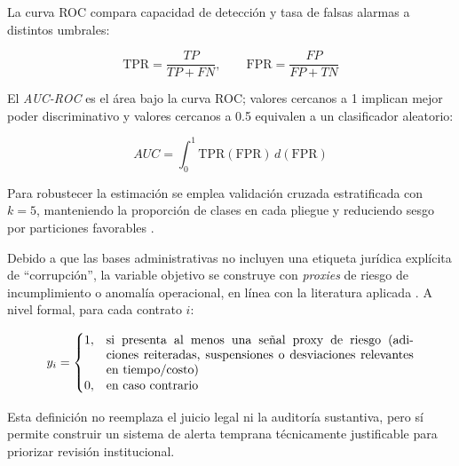 La curva ROC compara capacidad de detección y tasa de falsas alarmas a distintos umbrales:

\[
\text{TPR} = \frac{TP}{TP + FN}, \qquad
\text{FPR} = \frac{FP}{FP + TN}
\]

El \textit{AUC-ROC} es el área bajo la curva ROC; valores cercanos a 1 implican mejor poder discriminativo y valores cercanos a 0.5 equivalen a un clasificador aleatorio:

\[
AUC = \int_0^1 \text{TPR}( \text{FPR}) \, d(\text{FPR})
\]

Para robustecer la estimación se emplea validación cruzada estratificada con $k=5$, manteniendo la proporción de clases en cada pliegue y reduciendo sesgo por particiones favorables \cite{tas2024machine, gallego2021preventing}.

Debido a que las bases administrativas no incluyen una etiqueta jurídica explícita de ``corrupción'', la variable objetivo se construye con \textit{proxies} de riesgo de incumplimiento o anomalía operacional, en línea con la literatura aplicada \cite{gomez2025data, gomez2025analyzing, dulce2021deteccion}. A nivel formal, para cada contrato $i$:

\[
y_i =
\begin{cases}
1, & \parbox[t]{0.72\linewidth}{si presenta al menos una señal proxy de riesgo (adiciones reiteradas, suspensiones o desviaciones relevantes en tiempo/costo)} \\
0, & \text{en caso contrario}
\end{cases}
\]

Esta definición no reemplaza el juicio legal ni la auditoría sustantiva, pero sí permite construir un sistema de alerta temprana técnicamente justificable para priorizar revisión institucional.